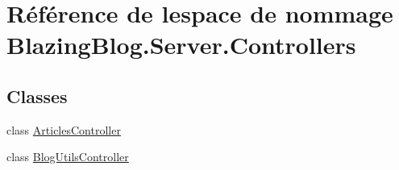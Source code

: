 \hypertarget{namespace_blazing_blog_1_1_server_1_1_controllers}{}\section{Référence de l\textquotesingle{}espace de nommage Blazing\+Blog.\+Server.\+Controllers}
\label{namespace_blazing_blog_1_1_server_1_1_controllers}
\subsection*{Classes}
\begin{DoxyCompactItemize}
\item 
class \hyperlink{class_blazing_blog_1_1_server_1_1_controllers_1_1_articles_controller}{Articles\+Controller}
\item 
class \hyperlink{class_blazing_blog_1_1_server_1_1_controllers_1_1_blog_utils_controller}{Blog\+Utils\+Controller}
\end{DoxyCompactItemize}
